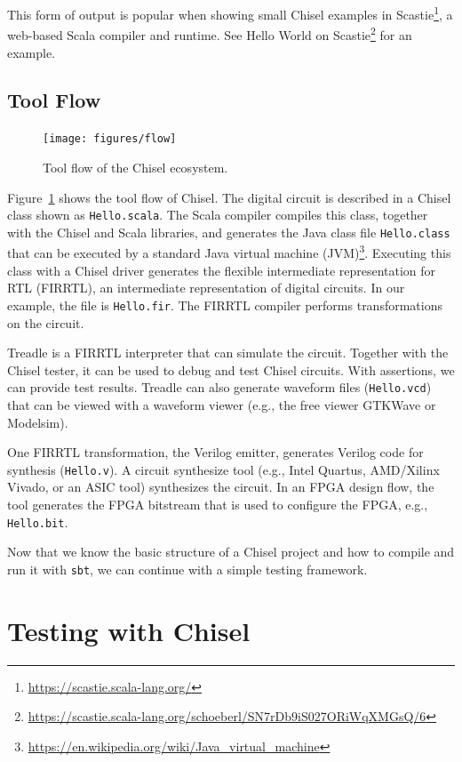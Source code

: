 \documentclass[%
    10pt,
    headinclude, footexclude,
    openright, %
    notitlepage,
    cleardoubleempty,
    headsepline,
    pointlessnumbers,
    bibtotoc, idxtotoc,
    ]{scrbook}
\newcommand{\code}[1]{{\lstinline[basicstyle=\small\ttfamily]{#1}}}
\newcommand{\myref}[2]{\href{#1}{#2}}
\renewcommand{\myref}[2]{{#2}{\footnote{\url{#1}}}}
\begin{document}
\noindent This form of output is popular when showing small Chisel examples in
\myref{https://scastie.scala-lang.org/}{Scastie}, a web-based Scala compiler and runtime.
See
\myref{https://scastie.scala-lang.org/schoeberl/SN7rDb9iS027ORiWqXMGsQ/6}{Hello World on Scastie}
for an example.


\subsection{Tool Flow}

\begin{figure}
  \centering
  \texttt{[image: figures/flow]}
  \caption{Tool flow of the Chisel ecosystem.}
  \label{fig:flow}
\end{figure}

Figure~\ref{fig:flow} shows the tool flow of Chisel. The digital circuit is described in a Chisel class
shown as \code{Hello.scala}. The Scala compiler compiles this class, together with the Chisel and Scala
libraries, and generates the Java class file \code{Hello.class} that can be executed by a standard
\myref{https://en.wikipedia.org/wiki/Java_virtual_machine}{Java virtual machine (JVM)}.
Executing this class with a Chisel driver generates the flexible intermediate representation for
RTL (FIRRTL), an intermediate representation of digital circuits. In our example, the file is \code{Hello.fir}.
The FIRRTL compiler performs transformations on the circuit.

Treadle is a FIRRTL interpreter that can simulate the circuit. Together with the Chisel tester, it can be
used to debug and test Chisel circuits. With assertions, we can provide test results.
Treadle can also generate waveform files (\code{Hello.vcd}) that can be viewed with
a waveform viewer (e.g., the free viewer GTKWave or Modelsim).

One FIRRTL transformation, the Verilog emitter, generates Verilog code for synthesis (\code{Hello.v}).
A circuit synthesize tool (e.g., Intel Quartus, AMD/Xilinx Vivado, or an ASIC tool) synthesizes the circuit.
In an FPGA design flow, the tool generates the FPGA bitstream that is used to configure the FPGA,
e.g., \code{Hello.bit}.

Now that we know the basic structure of a Chisel project and how to compile and run it
with \code{sbt}, we can continue with a simple testing framework.


\section{Testing with Chisel}
\end{document}
